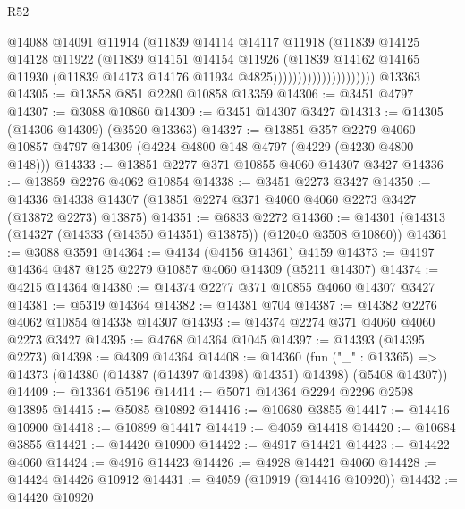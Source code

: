 \begin{lexlean}{R52}
\begin{coremodule}
                                    @14088
                                    @14091
                                    @11914
                                    (@11839
                                      @14114
                                      @14117
                                      @11918
                                      (@11839
                                        @14125
                                        @14128
                                        @11922
                                        (@11839
                                          @14151
                                          @14154
                                          @11926
                                          (@11839
                                            @14162
                                            @14165
                                            @11930
                                            (@11839 @14173 @14176 @11934 @4825)))))))))))))))))))))
    @13363
@14305 := @13858 @851 @2280 @10858 @13359
@14306 := @3451 @4797
@14307 := @3088 @10860
@14309 := @3451 @14307 @3427
@14313 := @14305 (@14306 @14309) (@3520 @13363)
@14327 := @13851
    @357
    @2279
    @4060
    @10857
    @4797
    @14309
    (@4224 @4800 @148 @4797 (@4229 (@4230 @4800 @148)))
@14333 := @13851 @2277 @371 @10855 @4060 @14307 @3427
@14336 := @13859 @2276 @4062 @10854
@14338 := @3451 @2273 @3427
@14350 := @14336 @14338 @14307 (@13851 @2274 @371 @4060 @4060 @2273 @3427 (@13872 @2273) @13875)
@14351 := @6833 @2272
@14360 := @14301 (@14313 (@14327 (@14333 (@14350 @14351) @13875)) (@12040 @3508 @10860))
@14361 := @3088 @3591
@14364 := @4134 (@4156 @14361) @4159
@14373 := @4197 @14364 @487 @125 @2279 @10857 @4060 @14309 (@5211 @14307)
@14374 := @4215 @14364
@14380 := @14374 @2277 @371 @10855 @4060 @14307 @3427
@14381 := @5319 @14364
@14382 := @14381 @704
@14387 := @14382 @2276 @4062 @10854 @14338 @14307
@14393 := @14374 @2274 @371 @4060 @4060 @2273 @3427
@14395 := @4768 @14364 @1045
@14397 := @14393 (@14395 @2273)
@14398 := @4309 @14364
@14408 := @14360
    (fun ("_" : @13365) => @14373 (@14380 (@14387 (@14397 @14398) @14351) @14398) (@5408 @14307))
@14409 := @13364 @5196
@14414 := @5071 @14364 @2294 @2296 @2598 @13895
@14415 := @5085 @10892
@14416 := @10680 @3855
@14417 := @14416 @10900
@14418 := @10899 @14417
@14419 := @4059 @14418
@14420 := @10684 @3855
@14421 := @14420 @10900
@14422 := @4917 @14421
@14423 := @14422 @4060
@14424 := @4916 @14423
@14426 := @4928 @14421 @4060
@14428 := @14424 @14426 @10912
@14431 := @4059 (@10919 (@14416 @10920))
@14432 := @14420 @10920

\end{coremodule}
\end{lexlean}
